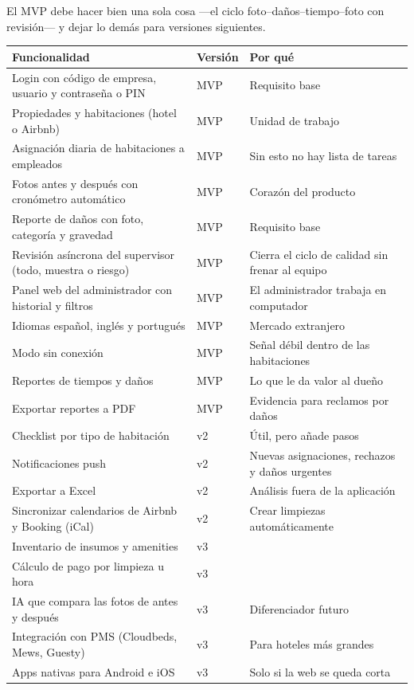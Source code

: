 \documentclass[11pt,a4paper]{article}
\begin{document}
El MVP debe hacer bien una sola cosa ---el ciclo foto--daños--tiempo--foto con revisión--- y dejar lo demás para versiones siguientes.

\begin{center}
\small
\begin{tabularx}{\linewidth}{Y L{1.3cm} L{5cm}}
\toprule
\textbf{Funcionalidad} & \textbf{Versión} & \textbf{Por qué}\\
\midrule
Login con código de empresa, usuario y contraseña o PIN & MVP & Requisito base\\
Propiedades y habitaciones (hotel o Airbnb) & MVP & Unidad de trabajo\\
Asignación diaria de habitaciones a empleados & MVP & Sin esto no hay lista de tareas\\
Fotos antes y después con cronómetro automático & MVP & Corazón del producto\\
Reporte de daños con foto, categoría y gravedad & MVP & Requisito base\\
Revisión asíncrona del supervisor (todo, muestra o riesgo) & MVP & Cierra el ciclo de calidad sin frenar al equipo\\
Panel web del administrador con historial y filtros & MVP & El administrador trabaja en computador\\
Idiomas español, inglés y portugués & MVP & Mercado extranjero\\
Modo sin conexión & MVP & Señal débil dentro de las habitaciones\\
Reportes de tiempos y daños & MVP & Lo que le da valor al dueño\\
Exportar reportes a PDF & MVP & Evidencia para reclamos por daños\\
\midrule
Checklist por tipo de habitación & v2 & Útil, pero añade pasos\\
Notificaciones push & v2 & Nuevas asignaciones, rechazos y daños urgentes\\
Exportar a Excel & v2 & Análisis fuera de la aplicación\\
Sincronizar calendarios de Airbnb y Booking (iCal) & v2 & Crear limpiezas automáticamente\\
\midrule
Inventario de insumos y amenities & v3 & \\
Cálculo de pago por limpieza u hora & v3 & \\
IA que compara las fotos de antes y después & v3 & Diferenciador futuro\\
Integración con PMS (Cloudbeds, Mews, Guesty) & v3 & Para hoteles más grandes\\
Apps nativas para Android e iOS & v3 & Solo si la web se queda corta\\
\bottomrule
\end{tabularx}
\end{center}
\end{document}
